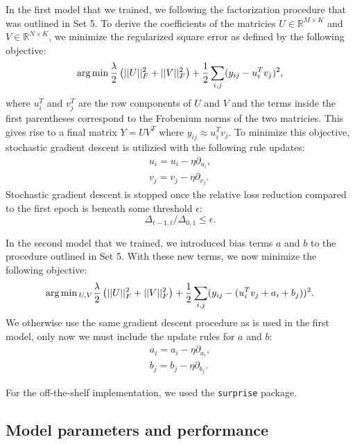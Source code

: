 In the first model that we trained, we following the factorization procedure that was outlined in Set 5. To derive the coefficients of the matricies 
$U \in \mathbb{R}^{M\times K}$ and $V \in \mathbb{R}^{N\times K}$, we minimize the regularized square error as defined by the following objective:
\begin{equation}
    \operatorname*{arg\,min} \frac{\lambda}{2}\left(||U||^2_F + ||V||^2_F\right) + \frac{1}{2}\sum_{i, j}(y_{ij} - u_i^Tv_j)^2,
\end{equation}
where $u_i^T$ and $v_j^T$ are the row components of $U$ and $V$ and the terms inside the first parentheses correspond to the Frobenium norms of 
the two matricies. This gives rise to a final matrix $Y = UV^T$ where $y_{ij} \approx u_i^Tv_j$. To minimize this objective, stochastic gradient 
descent is utilizied with the following rule updates:
\begin{align}
    u_i = u_{i} - \eta\partial_{u_{i}}, \\
    v_j = v_{j} - \eta\partial_{v_{j}}.
\end{align}
Stochastic gradient descent is stopped once the relative loss reduction compared to the first epoch is beneath some threshold $\epsilon$:
\begin{equation}
    \Delta_{t - 1, t}/\Delta_{0, 1} \le \epsilon.
\end{equation}
\par 
In the second model that we trained, we introduced bias terms $a$ and $b$ to the procedure outlined in Set 5. With these new terms, we now 
minimize the following objective:
\begin{equation}
    \operatorname*{arg\,min}{_{U, V}}\frac{\lambda}{2}\left(||U||^2_F + ||V||^2_F\right) + \frac{1}{2}\sum_{i, j}(y_{ij} - (u_i^Tv_j + a_i + b_j))^2.
\end{equation}
We otherwise use the same gradient descent procedure as is used in the first model, only now we must include the update rules for $a$ and 
$b$:
\begin{align}
    a_i = a_{i} - \eta\partial_{a_{i}}, \\
    b_j = b_{j} - \eta\partial_{b_{j}}.
\end{align}
\par 
For the off-the-shelf implementation, we used the \texttt{surprise} package.

\subsection{Model parameters and performance}

